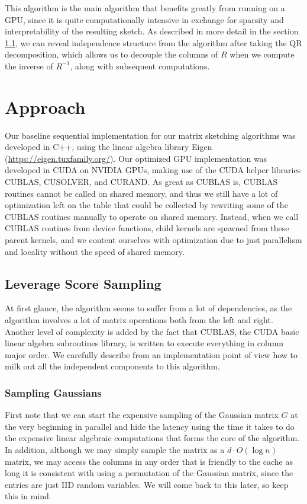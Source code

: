 \documentclass[12pt]{article}
\begin{document}
This algorithm is the main algorithm that benefits greatly from running on a GPU, since it is quite computationally intensive in exchange for sparsity and interpretability of the resulting sketch. As described in more detail in the section \ref{approach-leverage}, we can reveal independence structure from the algorithm after taking the QR decomposition, which allows us to decouple the columns of $R$ when we compute the inverse of $R^{-1}$, along with subsequent computations. 

\section{Approach}
Our baseline sequential implementation for our matrix sketching algorithms was developed in C++, using the linear algebra library Eigen (\url{https://eigen.tuxfamily.org/}). Our optimized GPU implementation was developed in CUDA on NVIDIA GPUs, making use of the CUDA helper libraries CUBLAS, CUSOLVER, and CURAND. As great as CUBLAS is, CUBLAS routines cannot be called on shared memory, and thus we still have a lot of optimization left on the table that could be collected by rewriting some of the CUBLAS routines manually to operate on shared memory. Instead, when we call CUBLAS routines from device functions, child kernels are spawned from these parent kernels, and we content ourselves with optimization due to just parallelism and locality without the speed of shared memory. 

\subsection{Leverage Score Sampling}\label{approach-leverage}
At first glance, the algorithm seems to suffer from a lot of dependencies, as the algorithm involves a lot of matrix operations both from the left and right. Another level of complexity is added by the fact that CUBLAS, the CUDA basic linear algebra subroutines library, is written to execute everything in column major order. We carefully describe from an implementation point of view how to milk out all the independent components to this algorithm.

\subsubsection{Sampling Gaussians}
First note that we can start the expensive sampling of the Gaussian matrix $G$ at the very beginning in parallel and hide the latency using the time it takes to do the expensive linear algebraic computations that forms the core of the algorithm. In addition, although we may simply sample the matrix as a $d\cdot O(\log n)$ matrix, we may access the columns in any order that is friendly to the cache as long it is consistent with using a permutation of the Gaussian matrix, since the entries are just IID random variables. We will come back to this later, so keep this in mind. 
\end{document}
